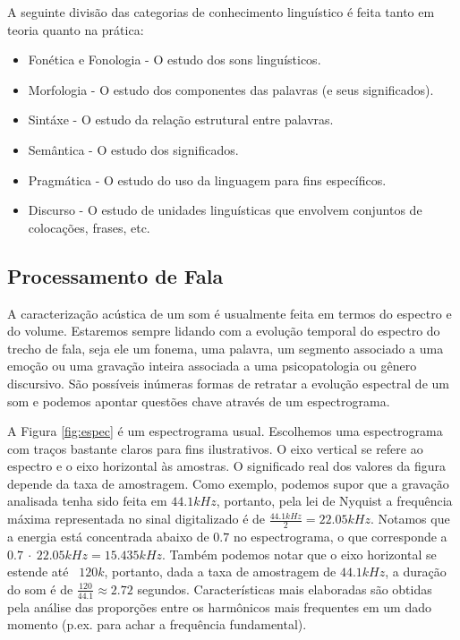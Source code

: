 \documentclass[12pt]{article}
\begin{document}
A seguinte divisão das categorias de conhecimento linguístico é feita tanto em teoria quanto na prática:

\begin{itemize}
  \item Fonética e Fonologia - O estudo dos sons linguísticos.

  \item Morfologia - O estudo dos componentes das palavras (e seus significados).

  \item Sintáxe - O estudo da relação estrutural entre palavras.

  \item Semântica - O estudo dos significados.

  \item Pragmática - O estudo do uso da linguagem para fins específicos.

  \item Discurso - O estudo de unidades linguísticas que envolvem conjuntos de colocações, frases, etc.
\end{itemize}

\subsection{Processamento de Fala}

A caracterização acústica de um som é usualmente feita em termos do espectro e do volume. Estaremos sempre lidando com a evolução temporal do espectro do trecho de fala, seja ele um fonema, uma palavra, um segmento associado a uma emoção ou uma gravação inteira associada a uma psicopatologia ou gênero discursivo. São possíveis inúmeras formas de retratar a evolução espectral de um som e podemos apontar questões chave através de um espectrograma.

A Figura \ref{fig:espec} é um espectrograma usual. Escolhemos uma espectrograma com traços bastante claros para fins ilustrativos. O eixo vertical se refere ao espectro e o eixo horizontal às amostras. O significado real dos valores da figura depende da taxa de amostragem. Como exemplo, podemos supor que a gravação analisada tenha sido feita em $44.1 kHz$, portanto, pela lei de Nyquist a frequência máxima representada no sinal digitalizado é de $\frac{44.1 kHz}{2} = 22.05 kHz$. Notamos que a energia está concentrada abaixo de $0.7$ no espectrograma, o que corresponde a $0.7 \: \cdot \: 22.05 kHz = 15.435kHz$. Também podemos notar que o eixo horizontal se estende até ~$120k$, portanto, dada a taxa de amostragem de $44.1 kHz$, a duração do som é de $\frac{120}{44.1} \approx 2.72$ segundos. Características mais elaboradas são obtidas pela análise das proporções entre os harmônicos mais frequentes em um dado momento (p.ex. para achar a frequência fundamental).
\end{document}
